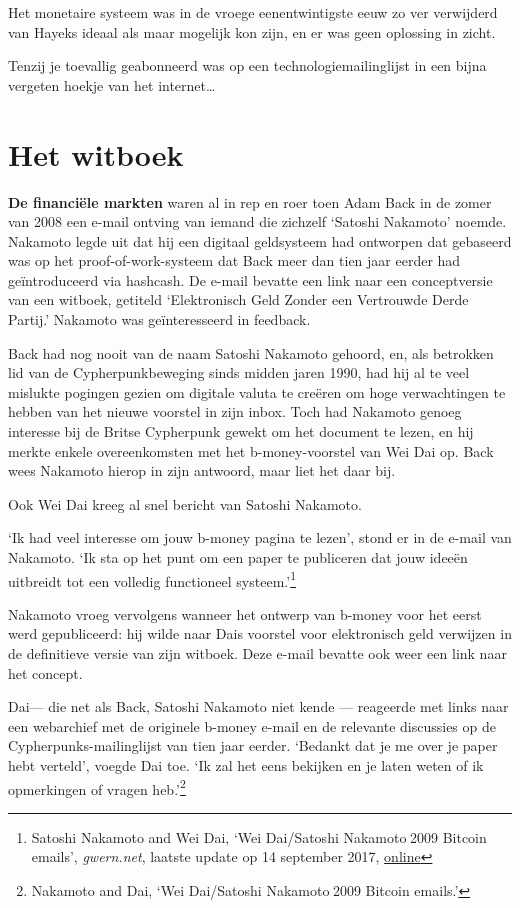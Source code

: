 \documentclass[
  a5paper,
  smalldemyvopaper,11pt,twoside,onecolumn,openright,extrafontsizes]{memoir}
\begin{document}
Het monetaire systeem was in de vroege eenentwintigste eeuw zo ver
verwijderd van Hayeks ideaal als maar mogelijk kon zijn, en er was geen
oplossing in zicht.

Tenzij je toevallig geabonneerd was op een technologiemailinglijst in
een bijna vergeten hoekje van het internet\ldots{}

\chapter{Het witboek}\label{het-witboek}

\textbf{De financiële markten} waren al in rep en roer toen Adam Back in
de zomer van 2008 een e-mail ontving van iemand die zichzelf `Satoshi
Nakamoto' noemde. Nakamoto legde uit dat hij een digitaal geldsysteem
had ontworpen dat gebaseerd was op het proof-of-work-systeem dat Back
meer dan tien jaar eerder had geïntroduceerd via hashcash. De e-mail
bevatte een link naar een conceptversie van een witboek, getiteld
`Elektronisch Geld Zonder een Vertrouwde Derde Partij.' Nakamoto was
geïnteresseerd in feedback.

Back had nog nooit van de naam Satoshi Nakamoto gehoord, en, als
betrokken lid van de Cypherpunkbeweging sinds midden jaren 1990, had hij
al te veel mislukte pogingen gezien om digitale valuta te creëren om
hoge verwachtingen te hebben van het nieuwe voorstel in zijn inbox. Toch
had Nakamoto genoeg interesse bij de Britse Cypherpunk gewekt om het
document te lezen, en hij merkte enkele overeenkomsten met het
b-money-voorstel van Wei Dai op. Back wees Nakamoto hierop in zijn
antwoord, maar liet het daar bij.

Ook Wei Dai kreeg al snel bericht van Satoshi Nakamoto.

`Ik had veel interesse om jouw b-money pagina te lezen', stond er in de
e-mail van Nakamoto. `Ik sta op het punt om een paper te publiceren dat
jouw ideeën uitbreidt tot een volledig functioneel systeem.'\footnote{Satoshi
  Nakamoto and Wei Dai, `Wei Dai/Satoshi Nakamoto 2009 Bitcoin emails',
  \emph{gwern.net}, laatste update op 14 september 2017,
  \href{https://gwern.net/doc/bitcoin/2008-nakamoto}{online}}

Nakamoto vroeg vervolgens wanneer het ontwerp van b-money voor het eerst
werd gepubliceerd: hij wilde naar Dais voorstel voor elektronisch geld
verwijzen in de definitieve versie van zijn witboek. Deze e-mail bevatte
ook weer een link naar het concept.

Dai--- die net als Back, Satoshi Nakamoto niet kende --- reageerde met
links naar een webarchief met de originele b-money e-mail en de
relevante discussies op de Cypherpunks-mailinglijst van tien jaar
eerder. `Bedankt dat je me over je paper hebt verteld', voegde Dai toe.
`Ik zal het eens bekijken en je laten weten of ik opmerkingen of vragen
heb.'\footnote{Nakamoto and Dai, `Wei Dai/Satoshi Nakamoto 2009 Bitcoin
  emails.'}
\end{document}
